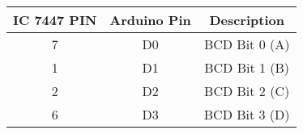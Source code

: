 \begin{tabular}{|c|c|c|}
\hline
IC 7447 PIN & Arduino Pin & Description\\
\hline

7 & D0 & BCD Bit 0 (A)\\
\hline
1 & D1 & BCD Bit 1 (B)\\
\hline
2 & D2 & BCD Bit 2 (C)\\
\hline
6 & D3 & BCD Bit 3 (D)\\
\hline
\end{tabular}
